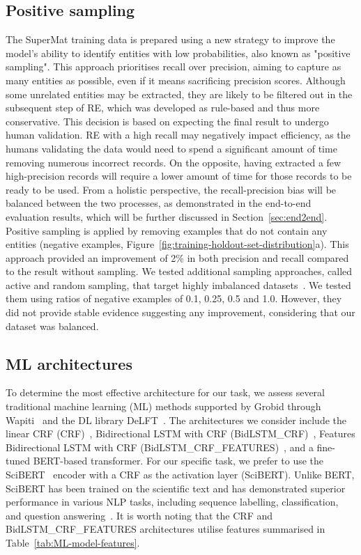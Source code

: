 \subsection{Positive sampling}
The SuperMat training data is prepared using a new strategy to improve the model's ability to identify entities with low probabilities, also known as "positive sampling". 
This approach prioritises recall over precision, aiming to capture as many entities as possible, even if it means sacrificing precision scores. 
Although some unrelated entities may be extracted, they are likely to be filtered out in the subsequent step of RE, which was developed as rule-based and thus more conservative. 
This decision is based on expecting the final result to undergo human validation. RE with a high recall may negatively impact efficiency, as the humans validating the data would need to spend a significant amount of time removing numerous incorrect records. On the opposite, having extracted a few high-precision records will require a lower amount of time for those records to be ready to be used.
From a holistic perspective, the recall-precision bias will be balanced between the two processes, as demonstrated in the end-to-end evaluation results, which will be further discussed in Section~\ref{sec:end2end}.
Positive sampling is applied by removing examples that do not contain any entities (negative examples, Figure~\ref{fig:training-holdout-set-distribution}a).
This approach provided an improvement of 2\% in both precision and recall compared to the result without sampling.
We tested additional sampling approaches, called active and random sampling, that target highly imbalanced datasets~\cite{lopez2021mining}. 
We tested them using ratios of negative examples of 0.1, 0.25, 0.5 and 1.0. However, they did not provide stable evidence suggesting any improvement, considering that our dataset was balanced. 

\subsection{ML architectures}
\label{sec:ml-architectures}
To determine the most effective architecture for our task, we assess several traditional machine learning (ML) methods supported by Grobid through Wapiti~\cite{lavergne2010practical} and the DL library DeLFT~\cite{delft}.
The architectures we consider include the linear CRF (CRF)~\cite{lafferty2001conditional}, Bidirectional LSTM with CRF (BidLSTM\_CRF)~\cite{lample2016neural}, Features Bidirectional LSTM with CRF (BidLSTM\_CRF\_FEATURES)~\cite{lample2016neural}, and a fine-tuned BERT-based transformer. For our specific task, we prefer to use the SciBERT~\cite{Beltagy2019SciBERT} encoder with a CRF as the activation layer (SciBERT). Unlike BERT, SciBERT has been trained on the scientific text and has demonstrated superior performance in various NLP tasks, including sequence labelling, classification, and question answering~\cite{Beltagy2019SciBERT}. It is worth noting that the CRF and BidLSTM\_CRF\_FEATURES architectures utilise features summarised in Table~\ref{tab:ML-model-features}.


